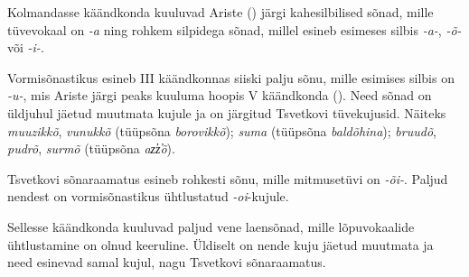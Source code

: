 \documentclass[12pt,a4paper]{article}
\newcommand{\vadja}[1]{\textit{#1}}
\begin{document}
Kolmandasse käändkonda kuuluvad Ariste (\citeyear[42]{ariste_grammar_1968}) järgi kahesilbilised sõnad, mille tüvevokaal on \vadja{-a} ning rohkem silpidega sõnad, millel esineb esimeses silbis \vadja{-a-}, \vadja{-õ-} või \vadja{-i-}.

Vormisõnastikus esineb \RN{3} käändkonnas siiski palju sõnu, mille esimises silbis on \textit{-u-}, mis Ariste järgi peaks kuuluma hoopis \RN{5} käändkonda (\cite[44]{ariste_grammar_1968}). Need sõnad on üldjuhul jäetud muutmata kujule ja on järgitud Tsvetkovi tüvekujusid. Näiteks \textit{muuzikkõ}, \textit{vunukkõ} (tüüp\-sõna \textit{borovikkõ}); \textit{suma} (tüüp\-sõna \textit{baldõhina}); \textit{bruudõ}, \textit{pudrõ}, \textit{surmõ} (tüüp\-sõna \textit{az̕z̕õ}).

Tsvetkovi sõnaraamatus esineb rohkesti sõnu, mille mitmuse\-tüvi on \textit{-õi-}. Paljud nendest on vormi\-sõnastikus ühtlustatud \textit{-oi}-kujule.

Sellesse käändkonda kuuluvad paljud vene laen\-sõnad, mille lõpu\-vokaalide ühtlustamine on olnud keeruline. Üldiselt on nende kuju jäetud muutmata ja need esinevad samal kujul, nagu Tsvetkovi sõnaraamatus.

\end{document}
